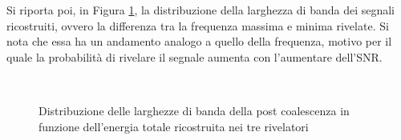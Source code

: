 Si riporta poi, in Figura \ref{fig:bandwidth_pm_Distrib}, la distribuzione della larghezza di banda dei segnali ricostruiti, ovvero la differenza tra la frequenza massima e minima rivelate. Si nota che essa ha un andamento analogo a quello della frequenza, motivo per il quale la probabilità di rivelare il segnale aumenta con l'aumentare dell'SNR.
\begin{figure}[hbt!]
	\centering
	\\
	\caption{Distribuzione delle larghezze di banda della post coalescenza in funzione dell'energia totale ricostruita nei tre rivelatori}
	\label{fig:bandwidth_pm_Distrib}
\end{figure}
%
